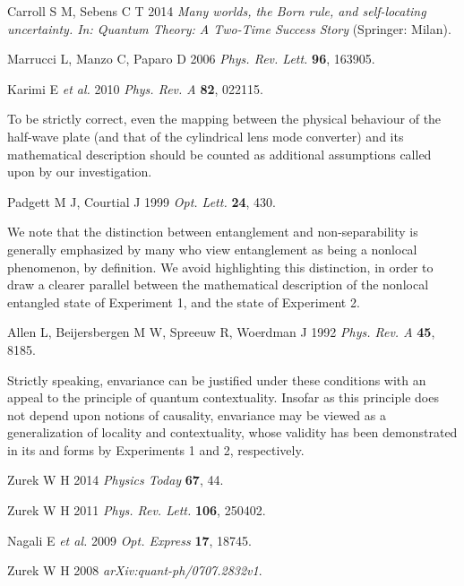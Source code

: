 \documentclass[12pt]{iopart}
\begin{document}
\begin{thebibliography}{99}
Carroll S M, Sebens C T 2014 \textit{Many worlds, the Born rule, and self-locating uncertainty. In: Quantum Theory: A Two-Time Success Story} (Springer: Milan).

Marrucci L, Manzo C, Paparo D 2006 \textit{Phys. Rev. Lett.} {\bf 96}, 163905.

Karimi E \textit{et al.} 2010 \textit{Phys. Rev. A} {\bf 82}, 022115.

{To be strictly correct, even the mapping between the physical behaviour of the half-wave plate (and that of the cylindrical lens mode converter) and its mathematical description should be counted as additional assumptions called upon by our investigation.}

Padgett M J, Courtial J 1999 \textit{Opt. Lett.} {\bf 24}, 430.

We note that the distinction between entanglement and non-separability is generally emphasized by many who view entanglement as being a nonlocal phenomenon, by definition. We avoid highlighting this distinction, in order to draw a clearer parallel between the mathematical description of the nonlocal entangled state of Experiment 1, and the  state of Experiment 2.

Allen L, Beijersbergen M W, Spreeuw R, Woerdman J 1992 \textit{Phys. Rev. A} {\bf 45}, 8185.

Strictly speaking, envariance can be justified under these conditions with an appeal to the principle of quantum contextuality. Insofar as this principle does not depend upon notions of causality, envariance may be viewed as a generalization of locality and contextuality, whose validity has been demonstrated in its  and  forms by Experiments 1 and 2, respectively. 

Zurek W H 2014 \textit{Physics Today} {\bf 67}, 44.

{Zurek W H 2011 \textit{Phys. Rev. Lett.} {\bf 106}, 250402}.

Nagali E \textit{et al.} 2009 \textit{Opt. Express} {\bf 17}, 18745.

Zurek W H 2008 \textit{arXiv:quant-ph/0707.2832v1}.

\end{thebibliography}
\end{document}

